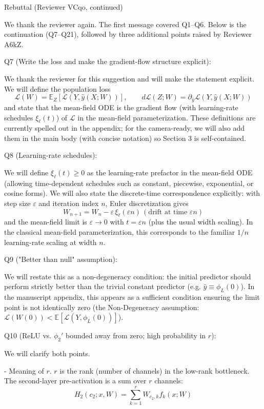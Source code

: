Rebuttal (Reviewer VCqo, continued)

We thank the reviewer again. The first message covered Q1--Q6. Below is the continuation (Q7--Q21), followed by three additional points raised by Reviewer A6kZ.

Q7 (Write the loss and make the gradient-flow structure explicit):

We thank the reviewer for this suggestion and will make the statement explicit. We will define the population loss
$$
\mathcal L(W)=\mathbb E_Z[\mathcal L(Y,\hat y(X;W))],\qquad
d\mathcal L(Z;W)=\partial_{\hat y}\mathcal L(Y,\hat y(X;W))
$$
and state that the mean-field ODE is the gradient flow (with learning-rate schedules $\xi_\ell(t)$) of $\mathcal L$ in the mean-field parameterization. These definitions are currently spelled out in the appendix; for the camera-ready, we will also add them in the main body (with concise notation) so Section 3 is self-contained.

Q8 (Learning-rate schedules):

We will define $\xi_\ell(t)\ge 0$ as the learning-rate prefactor in the mean-field ODE (allowing time-dependent schedules such as constant, piecewise, exponential, or cosine forms). We will also state the discrete-time correspondence explicitly: with step size $\varepsilon$ and iteration index $n$, Euler discretization gives
$$
W_{n+1}=W_n-\varepsilon\,\xi_\ell(\varepsilon n)\,(\text{drift at time }\varepsilon n)
$$
and the mean-field limit is $\varepsilon\to 0$ with $t=\varepsilon n$ (plus the usual width scaling). In the classical mean-field parameterization, this corresponds to the familiar $1/n$ learning-rate scaling at width $n$.

Q9 ("Better than null" assumption):

We will restate this as a non-degeneracy condition: the initial predictor should perform strictly better than the trivial constant predictor (e.g. $\hat y\equiv \phi_L(0)$). In the manuscript appendix, this appears as a sufficient condition ensuring the limit point is not identically zero (the Non-Degeneracy assumption: $\mathcal L(W(0))<\mathbb E[\mathcal L(Y,\phi_L(0))]$).

Q10 (ReLU vs. $\phi_2'$ bounded away from zero; high probability in $r$):

We will clarify both points.

- Meaning of $r$. $r$ is the rank (number of channels) in the low-rank bottleneck. The second-layer pre-activation is a sum over $r$ channels:
$$
H_2(c_2;x,W)=\sum_{k=1}^r W_{c_2,k}f_k(x;W)
$$

